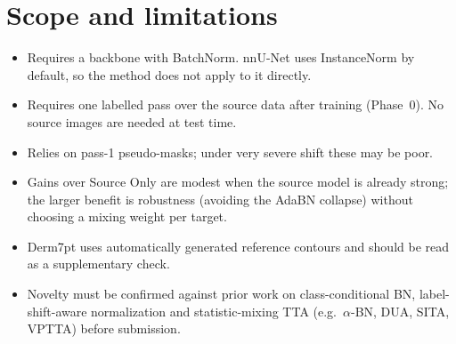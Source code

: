 \documentclass[11pt,a4paper]{article}
\begin{document}
\section{Scope and limitations}
\begin{itemize}
\item Requires a backbone with BatchNorm. nnU-Net uses InstanceNorm by default, so the method does not apply to it directly.
\item Requires one labelled pass over the source data after training (Phase~0). No source images are needed at test time.
\item Relies on pass-1 pseudo-masks; under very severe shift these may be poor.
\item Gains over Source Only are modest when the source model is already strong; the larger benefit is robustness (avoiding the AdaBN collapse) without choosing a mixing weight per target.
\item Derm7pt uses automatically generated reference contours and should be read as a supplementary check.
\item Novelty must be confirmed against prior work on class-conditional BN, label-shift-aware normalization and statistic-mixing TTA (e.g.\ $\alpha$-BN, DUA, SITA, VPTTA) before submission.
\end{itemize}
\end{document}
